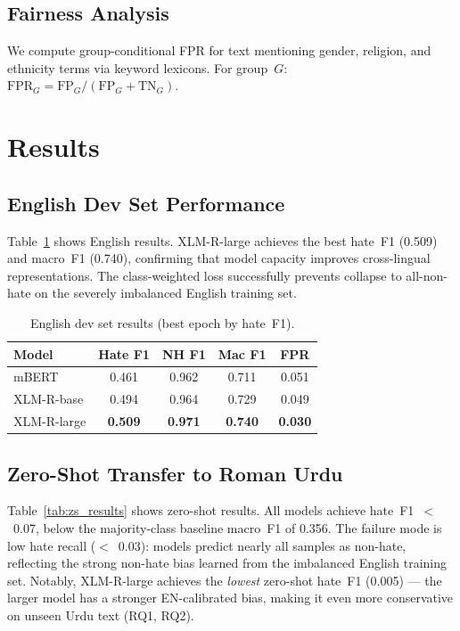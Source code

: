 \documentclass{article}
\begin{document}
\subsection{Fairness Analysis}

We compute group-conditional FPR for text mentioning gender, religion, and
ethnicity terms via keyword lexicons.
For group~$G$: $\mathrm{FPR}_G = \mathrm{FP}_G / (\mathrm{FP}_G + \mathrm{TN}_G)$.

\section{Results}
\label{sec:results}

\subsection{English Dev Set Performance}

Table~\ref{tab:en_results} shows English results.
XLM-R-large achieves the best hate~F1 (0.509) and macro~F1 (0.740), confirming
that model capacity improves cross-lingual representations.
The class-weighted loss successfully prevents collapse to all-non-hate on the
severely imbalanced English training set.

\begin{table}[h]
\centering
\caption{English dev set results (best epoch by hate~F1).}
\label{tab:en_results}
\vskip 0.05in
\begin{small}
\begin{tabular}{lcccc}
\toprule
Model & Hate F1 & NH F1 & Mac F1 & FPR \\
\midrule
mBERT          & 0.461 & 0.962 & 0.711 & 0.051 \\
XLM-R-base     & 0.494 & 0.964 & 0.729 & 0.049 \\
XLM-R-large    & \textbf{0.509} & \textbf{0.971} & \textbf{0.740} & \textbf{0.030} \\
\bottomrule
\end{tabular}
\end{small}
\end{table}

\subsection{Zero-Shot Transfer to Roman Urdu}

Table~\ref{tab:zs_results} shows zero-shot results.
All models achieve hate~F1~$<$~0.07, below the majority-class baseline macro~F1
of 0.356.
The failure mode is low hate recall ($<$~0.03): models predict nearly all samples
as non-hate, reflecting the strong non-hate bias learned from the imbalanced English
training set.
Notably, XLM-R-large achieves the \emph{lowest} zero-shot hate~F1 (0.005) ---
the larger model has a stronger EN-calibrated bias, making it even more conservative
on unseen Urdu text (RQ1, RQ2).
\end{document}

